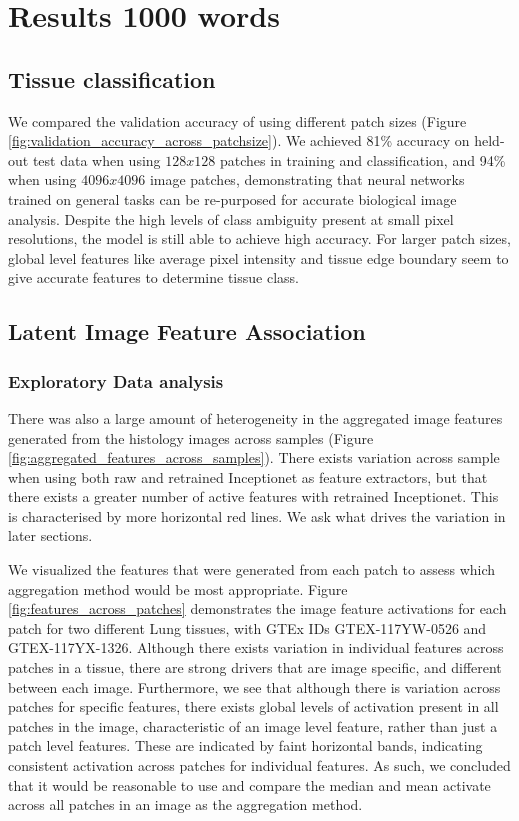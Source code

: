 \documentclass[graybox]{svmult}
\begin{document}
\section{Results 1000 words}

\subsection{Tissue classification}

We compared the validation accuracy of using different patch sizes (Figure \ref{fig:validation_accuracy_across_patchsize}). We achieved 81\% accuracy on held-out test data when using $128x128$ patches in training and classification, and 94\% when using $4096x4096$ image patches, demonstrating that neural networks trained on general tasks can be re-purposed for accurate biological image analysis. Despite the high levels of class ambiguity present at small pixel resolutions, the model is still able to achieve high accuracy. For larger patch sizes, global level features like average pixel intensity and tissue edge boundary seem to give accurate features to determine tissue class.



\subsection{Latent Image Feature Association}

\subsubsection{Exploratory Data analysis}

There was also a large amount of heterogeneity in the aggregated image features generated from the histology images across samples (Figure \ref{fig:aggregated_features_across_samples}). There exists variation across sample when using both raw and retrained Inceptionet as feature extractors, but that there exists a greater number of active features with retrained Inceptionet. This is characterised by more horizontal red lines. We ask what drives the variation in later sections.
 
 We visualized the features that were generated from each patch to assess which aggregation method would be most appropriate. Figure \ref{fig:features_across_patches} demonstrates the image feature activations for each patch for two different Lung tissues, with GTEx IDs GTEX-117YW-0526 and GTEX-117YX-1326. Although there exists variation in individual features across patches in a tissue, there are strong drivers that are image specific, and different between each image. Furthermore, we see that although there is variation across patches for specific features, there exists global levels of activation present in all patches in the image, characteristic of an image level feature, rather than just a patch level features. These are indicated by faint horizontal bands, indicating consistent activation across patches for individual features. As such, we concluded that it would be reasonable to use and compare the median and mean activate across all patches in an image as the aggregation method.
\end{document}
